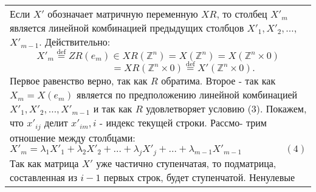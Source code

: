 \begin{tabular}{|p{12.5cm}}
	Если $X'$ обозначает матричную переменную $XR$, то столбец $X'_m$\linebreak
	является линейной комбинацией предыдущих столбцов $X'_1, X'_2, \ldots$,\linebreak
	$X'_{m - 1}$. Действительно:
	$$X'_m \stackrel{\text{def}}{=} ZR(e_m)\in XR({\mathbb Z}^n) = X({\mathbb Z}^n) = X({\mathbb Z}^n \times 0)$$
	$${\ \ \ \ \ \ \ \ \ \ \ \ \ \ \ \ \ \ \ \ \ \ \ }= XR({\mathbb Z}^n \times 0) \stackrel{\text{def}}{=} X'({\mathbb Z}^n \times 0).$$
	Первое равенство верно, так как $R$ обратима. Второе - так как\linebreak
	$X_m = X(e_m)$ является по предположению линейной комбинацией\linebreak
	$X'_1, X'_2, \ldots, X'_{m - 1}$ и так как $R$ удовлетворяет условию (3).\linebreak
	Покажем, что $x'_{ij}$ делит $x'_{im}, i$ - индекс текущей строки. Рассмо-\linebreak
	трим отношение между столбцами:
	$$X'_m = \lambda_1 X'_1 + \lambda_2 X'_2 + \ldots + \lambda_j X'_j + \ldots + \lambda_{m - 1} X'_{m - 1} {\ \ \ \ \ \ \ \ \ \ \ \ \ \ \ \ \ \ \ \ (4)}$$
	Так как матрица $X'$ уже частично ступенчатая, то подматрица,\linebreak
	составленная из $i - 1$ первых строк, будет ступенчатой. Ненулевые\linebreak
	\end{tabular}
	
	\pagebreak
	
	
